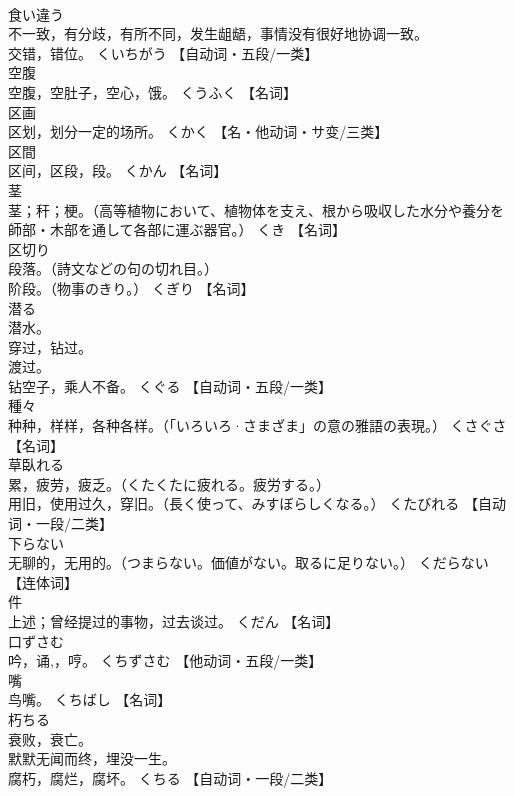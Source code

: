 \documentclass[8pt]{extreport}
\begin{document}
\begin{CJK}{UTF8}{min}
\\	食い違う	
\\	不一致，有分歧，有所不同，发生龃龉，事情没有很好地协调一致。 
\\	交错，错位。	くいちがう		【自动词・五段/一类】
\\	空腹	
\\	空腹，空肚子，空心，饿。	くうふく		【名词】
\\	区画	
\\	区划，划分一定的场所。	くかく		【名・他动词・サ变/三类】
\\	区間	
\\	区间，区段，段。	くかん		【名词】
\\	茎	
\\	茎；秆；梗。（高等植物において、植物体を支え、根から吸収した水分や養分を師部・木部を通して各部に運ぶ器官。）	くき		【名词】
\\	区切り	
\\	段落。（詩文などの句の切れ目。） 
\\	阶段。（物事のきり。）	くぎり		【名词】
\\	潜る	
\\	潜水。 
\\	穿过，钻过。 
\\	渡过。 
\\	钻空子，乘人不备。	くぐる		【自动词・五段/一类】
\\	種々	
\\	种种，样样，各种各样。（「いろいろ·さまざま」の意の雅語の表現。）	くさぐさ		【名词】
\\	草臥れる	
\\	累，疲劳，疲乏。（くたくたに疲れる。疲労する。） 
\\	用旧，使用过久，穿旧。（長く使って、みすぼらしくなる。）	くたびれる		【自动词・一段/二类】
\\	下らない	
\\	无聊的，无用的。（つまらない。価値がない。取るに足りない。）	くだらない		【连体词】
\\	件	
\\	上述；曾经提过的事物，过去谈过。	くだん		【名词】
\\	口ずさむ	
\\	吟，诵,，哼。	くちずさむ		【他动词・五段/一类】
\\	嘴	
\\	鸟嘴。	くちばし		【名词】
\\	朽ちる	
\\	衰败，衰亡。 
\\	默默无闻而终，埋没一生。 
\\	腐朽，腐烂，腐坏。	くちる		【自动词・一段/二类】

\end{CJK}
\end{document}
